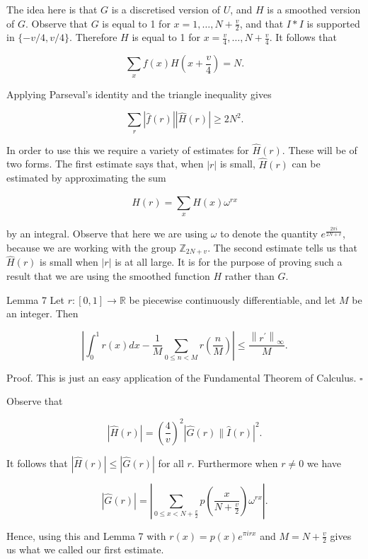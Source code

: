 \documentclass[10pt]{article}
\begin{document}
The idea here is that $G$ is a discretised version of $U$, and $H$ is a smoothed version of $G$. Observe that $G$ is equal to 1 for $x=1, \ldots, N+\frac{v}{2}$, and that $I * I$ is supported in $\{-v / 4, v / 4\}$. Therefore $H$ is equal to 1 for $x=\frac{v}{4}, \ldots, N+\frac{v}{4}$. It follows that

$$
\sum_{x} f(x) H\left(x+\frac{v}{4}\right)=N .
$$

Applying Parseval's identity and the triangle inequality gives


\begin{equation*}
\sum_{r}|\hat{f}(r)||\hat{H}(r)| \geq 2 N^{2} . \tag{19}
\end{equation*}


In order to use this we require a variety of estimates for $\hat{H}(r)$. These will be of two forms. The first estimate says that, when $|r|$ is small, $\hat{H}(r)$ can be estimated by approximating the sum

$$
\hat{H}(r)=\sum_{x} H(x) \omega^{r x}
$$

by an integral. Observe that here we are using $\omega$ to denote the quantity $e^{\frac{2 \pi i}{2 N+v}}$, because we are working with the group $\mathbb{Z}_{2 N+v}$. The second estimate tells us that $\hat{H}(r)$ is small when $|r|$ is at all large. It is for the purpose of proving such a result that we are using the smoothed function $H$ rather than $G$.

Lemma 7 Let $r:[0,1] \rightarrow \mathbb{R}$ be piecewise continuously differentiable, and let $M$ be an integer. Then

$$
\left|\int_{0}^{1} r(x) d x-\frac{1}{M} \sum_{0 \leq n<M} r\left(\frac{n}{M}\right)\right| \leq \frac{\left\|r^{\prime}\right\|_{\infty}}{M} .
$$

Proof. This is just an easy application of the Fundamental Theorem of Calculus. \(\square\)

Observe that


\begin{equation*}
|\hat{H}(r)|=\left(\frac{4}{v}\right)^{2}|\hat{G}(r) \| \hat{I}(r)|^{2} . \tag{20}
\end{equation*}


It follows that $|\hat{H}(r)| \leq|\hat{G}(r)|$ for all $r$. Furthermore when $r \neq 0$ we have

$$
|\hat{G}(r)|=\left|\sum_{0 \leq x<N+\frac{v}{2}} p\left(\frac{x}{N+\frac{v}{2}}\right) \omega^{r x}\right| .
$$

Hence, using this and Lemma 7 with $r(x)=p(x) e^{\pi i r x}$ and $M=N+\frac{v}{2}$ gives us what we called our first estimate.
\end{document}
